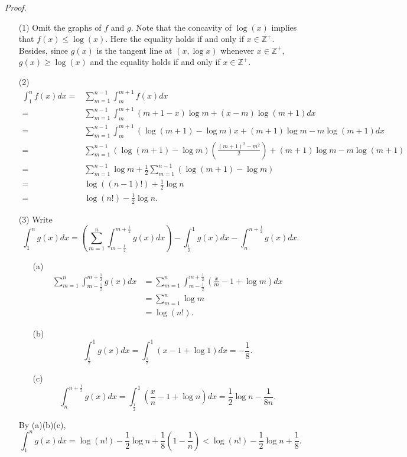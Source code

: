\documentclass{article}
\begin{document}
\emph{Proof.}
\begin{enumerate}
\item[(1)]
Omit the  graphs of $f$ and $g$.
Note that the concavity of $\log(x)$ implies that $f(x) \leq \log(x)$.
Here the equality holds if and only if $x \in \mathbb{Z}^+$.
Besides, since
$g(x)$ is the tangent line at $(x, \log x)$ whenever $x \in \mathbb{Z}^+$,
$g(x) \geq \log(x)$ and
the equality holds if and only if $x \in \mathbb{Z}^+$.

\item[(2)]
\begin{align*}
  \int_{1}^{n} f(x)dx
  =& \sum_{m=1}^{n-1} \int_{m}^{m+1} f(x)dx \\
  =& \sum_{m=1}^{n-1} \int_{m}^{m+1} (m+1-x) \log m + (x-m) \log(m+1) dx \\
  =& \sum_{m=1}^{n-1} \int_{m}^{m+1}
    (\log(m+1)-\log m)x + (m+1)\log m-m\log(m+1) dx \\
  =& \sum_{m=1}^{n-1} (\log(m+1)-\log m)\left( \frac{(m+1)^2-m^2}{2} \right)
    + (m+1)\log m - m\log(m+1) \\
  =& \sum_{m=1}^{n-1} \log m + \frac{1}{2} \sum_{m=1}^{n-1}(\log(m+1)-\log m) \\
  =& \log((n-1)!) + \frac{1}{2} \log n \\
  =& \log(n!) - \frac{1}{2} \log n.
\end{align*}

\item[(3)]
Write
\[
  \int_{1}^{n} g(x)dx
  = \left( \sum_{m=1}^{n} \int_{m-\frac{1}{2}}^{m+\frac{1}{2}} g(x)dx \right)
    - \int_{\frac{1}{2}}^{1} g(x)dx
    - \int_{n}^{n+\frac{1}{2}} g(x)dx.
\]
  \begin{enumerate}
  \item[(a)]
    \begin{align*}
      \sum_{m=1}^{n} \int_{m-\frac{1}{2}}^{m+\frac{1}{2}} g(x) dx
      &=
      \sum_{m=1}^{n} \int_{m-\frac{1}{2}}^{m+\frac{1}{2}}
        \left( \frac{x}{m} - 1 + \log m \right) dx \\
      &=
      \sum_{m=1}^{n} \log m \\
      &= \log(n!).
    \end{align*}
  \item[(b)]
    \[
      \int_{\frac{1}{2}}^{1} g(x)dx
      = \int_{\frac{1}{2}}^{1} (x - 1 + \log 1) dx
      = -\frac{1}{8}.
    \]
  \item[(c)]
    \[
      \int_{n}^{n+\frac{1}{2}} g(x)dx
      = \int_{\frac{1}{2}}^{1} \left( \frac{x}{n} - 1 + \log n \right) dx
      = \frac{1}{2} \log n - \frac{1}{8n}.
    \]
  \end{enumerate}
By (a)(b)(c),
\[
  \int_{1}^{n} g(x)dx
  = \log(n!) - \frac{1}{2} \log n + \frac{1}{8}(1 - \frac{1}{n})
  < \log(n!) - \frac{1}{2} \log n + \frac{1}{8}.
\]


\end{enumerate}
\end{document}
